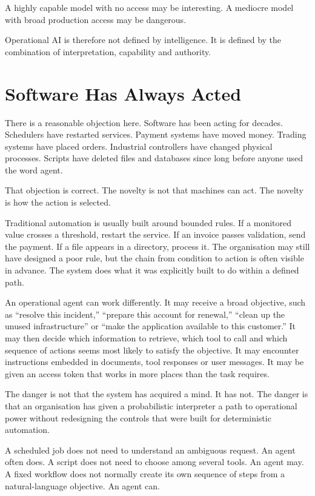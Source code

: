 A highly capable model with no access may be interesting. A mediocre
model with broad production access may be dangerous.

Operational AI is therefore not defined by intelligence. It is defined
by the combination of interpretation, capability and authority.

\section{Software Has Always Acted}\label{software-has-always-acted}

There is a reasonable objection here. Software has been acting for
decades. Schedulers have restarted services. Payment systems have moved
money. Trading systems have placed orders. Industrial controllers have
changed physical processes. Scripts have deleted files and databases
since long before anyone used the word agent.

That objection is correct. The novelty is not that machines can act. The
novelty is how the action is selected.

Traditional automation is usually built around bounded rules. If a
monitored value crosses a threshold, restart the service. If an invoice
passes validation, send the payment. If a file appears in a directory,
process it. The organisation may still have designed a poor rule, but
the chain from condition to action is often visible in advance. The
system does what it was explicitly built to do within a defined path.

An operational agent can work differently. It may receive a broad
objective, such as ``resolve this incident,'' ``prepare this account for
renewal,'' ``clean up the unused infrastructure'' or ``make the
application available to this customer.'' It may then decide which
information to retrieve, which tool to call and which sequence of
actions seems most likely to satisfy the objective. It may encounter
instructions embedded in documents, tool responses or user messages. It
may be given an access token that works in more places than the task
requires.

The danger is not that the system has acquired a mind. It has not. The
danger is that an organisation has given a probabilistic interpreter a
path to operational power without redesigning the controls that were
built for deterministic automation.

A scheduled job does not need to understand an ambiguous request. An
agent often does. A script does not need to choose among several tools.
An agent may. A fixed workflow does not normally create its own sequence
of steps from a natural-language objective. An agent can.

